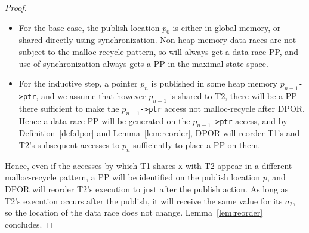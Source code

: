 \begin{proof}
\newcommand\publish[1]{$p_{#1}$}
\begin{itemize}
	\item For the base case, the publish location \publish{0} is either in global memory, or shared directly using synchronization.
		Non-heap memory data races are not subject to the malloc-recycle pattern, so will always get a data-race PP,
		and use of synchronization always gets a PP in the maximal state space.
	\item For the inductive step, a pointer \publish{n} is published in some heap memory \publish{n-1}\texttt{->ptr},
		and we assume that however \publish{n-1} is shared to T2,
		there will be a PP there
		sufficient to make the \publish{n-1}\texttt{->ptr} access not malloc-recycle after DPOR.
		Hence a data race PP will be generated on the \publish{n-1}\texttt{->ptr} access,
		and by Definition~\ref{def:dpor} and Lemma~\ref{lem:reorder},
		DPOR will reorder T1's and T2's subsequent accesses to \publish{n} sufficiently to place a PP on them.
\end{itemize}

Hence, even if the accesses by which T1 shares {\tt x} with T2 appear in a different malloc-recycle pattern,
a PP will be identified on the publish location $p$,
and DPOR will reorder T2's execution to just after the publish action.
As long as T2's execution occurs after the publish, it will receive the same value for its $a_2$, so the location of the data race does not change.
Lemma~\ref{lem:reorder} concludes.

\end{proof}


